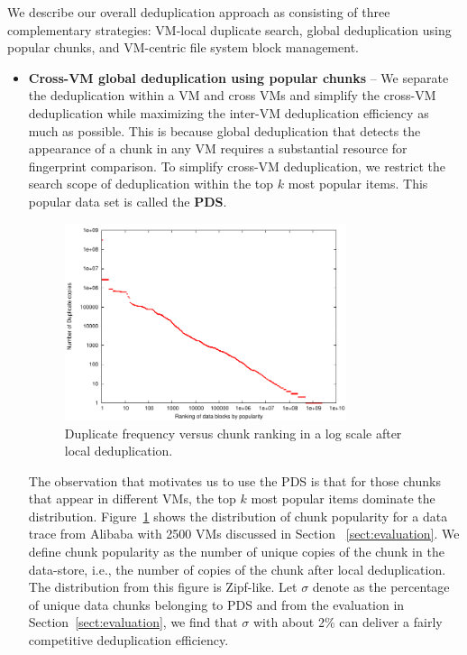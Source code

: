 We describe our overall deduplication approach as consisting of three
complementary strategies: VM-local
duplicate search, global deduplication using popular chunks, and 
VM-centric file system block management. 
\begin{itemize}
\item 
\textbf{Cross-VM global deduplication using popular chunks} --
We separate the deduplication within a VM and cross VMs
and simplify the cross-VM deduplication while maximizing the inter-VM deduplication efficiency  as much as possible.
This is because global deduplication that detects the appearance of a chunk 
in any VM requires a substantial resource for fingerprint comparison.
To simplify cross-VM deduplication, we restrict the search scope of deduplication within the top $k$ 
most popular items. This popular data set is called the \textbf{PDS}. 
 \begin{figure}
 \centering
  \includegraphics[width=3.25in]{figures/zipf_count_rank.pdf}
 \caption{Duplicate frequency versus  chunk ranking in a log scale after local deduplication.}
 \label{fig:Datazipf}
 \end{figure}


The observation that motivates us to use the PDS
is that for those chunks that appear in different VMs, the top $k$ most popular items
dominate the distribution.  
Figure~\ref{fig:Datazipf} shows the distribution of chunk popularity for a data trace 
from Alibaba with 2500 VMs discussed in Section ~\ref{sect:evaluation}.
We define chunk popularity as the number of unique copies of the chunk in the data-store,
i.e., the number of copies of the chunk after local deduplication.
The distribution from this figure is Zipf-like. 
Let  $\sigma$ denote as the percentage of unique data chunks belonging to PDS and 
from the evaluation in Section~\ref{sect:evaluation}, we find that
$\sigma$ with about  2\% can deliver a fairly competitive deduplication efficiency.


\end{itemize}
